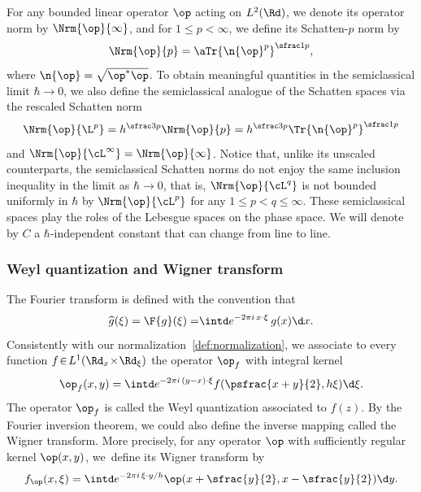 For any bounded linear operator $\op$ acting on $L^2(\Rd)$, we denote its operator norm by $\Nrm{\op}{\infty}$, and for $1\le p < \infty$, we define its Schatten-$p$ norm by
\begin{equation*}
\Nrm{\op}{p}= \aTr{\n{\op}^p}^{\sfrac1p},
\end{equation*}
where $\n{\op} = \sqrt{\op^\ast \op}$. To obtain meaningful quantities in the semiclassical limit \hbox{$\hbar\to 0$}, we also define the semiclassical analogue of the Schatten spaces via the rescaled Schatten norm
\begin{equation*}
\Nrm{\op}{\L^p} = h^{\sfrac3p} \Nrm{\op}{p}= h^{\sfrac3p}\Tr{\n{\op}^p}^{\sfrac1p}
\end{equation*}
and $\Nrm{\op}{\cL^\infty}=\Nrm{\op}{\infty}$. Notice that, unlike its unscaled counterparts, the semiclassical Schatten norms do not enjoy the same inclusion inequality in the limit as $\hbar\to 0$, that is, $\Nrm{\op}{\cL^q}$ is not bounded uniformly in $\hbar$ by $\Nrm{\op}{\cL^p}$ for any $1\le p< q\le \infty$. These semiclassical spaces play the roles of the Lebesgue spaces on the phase space. We will denote by $C$ a $\hbar$-independent constant that can change from line to line.

\subsubsection{Weyl quantization and Wigner transform} The Fourier transform is defined with the convention that
\begin{equation*}
\widehat g(\xi) = {\F{g}(\xi) =} \intd e^{-2\pi i\, x\cdot \xi}\,g(x)\d x.
\end{equation*}
Consistently with our normalization~\eqref{def:normalization}, we associate to every function \hbox{$f \!\in\! L^1(\Rd_x\!\times\!\Rd_{\xi})$} the operator $\op_f$ with integral kernel
\begin{equation*}
\op_f(x, y) = \intd e^{-2\pi i\, (y-x)\cdot \xi} f(\psfrac{x+y}{2}, h\xi)\d \xi.
\end{equation*}
The operator $\op_f$ is called the Weyl quantization associated to $f(z)$. By the Fourier inversion theorem, we could also define the inverse mapping called the Wigner transform. More precisely, for any operator $\op$ with sufficiently regular kernel $\op(x, y)$, we~define its Wigner transform by
\begin{equation*}
f_{\op}(x, \xi) = \intd e^{-2\pi i\, \xi\cdot y/h} \op(x+\sfrac{y}{2}, x-\sfrac{y}{2})\d y.
\end{equation*}

